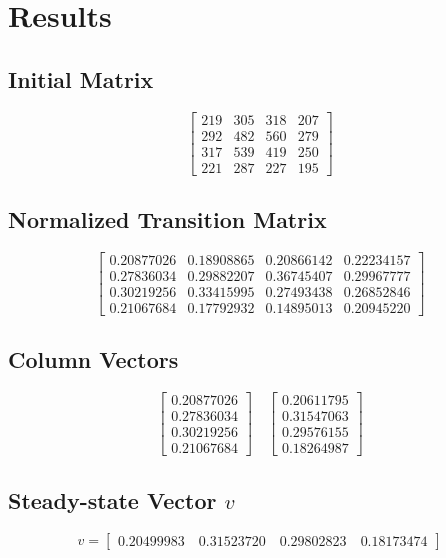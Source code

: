 \documentclass{article}
\begin{document}
\section*{Results}

\subsection*{Initial Matrix}
\[
\begin{bmatrix}
219 & 305 & 318 & 207 \\
292 & 482 & 560 & 279 \\
317 & 539 & 419 & 250 \\
221 & 287 & 227 & 195
\end{bmatrix}
\]

\subsection*{Normalized Transition Matrix}
\[
\begin{bmatrix}
0.20877026 & 0.18908865 & 0.20866142 & 0.22234157 \\
0.27836034 & 0.29882207 & 0.36745407 & 0.29967777 \\
0.30219256 & 0.33415995 & 0.27493438 & 0.26852846 \\
0.21067684 & 0.17792932 & 0.14895013 & 0.20945220
\end{bmatrix}
\]

\subsection*{Column Vectors}
\[
\begin{bmatrix}
0.20877026 \\
0.27836034 \\
0.30219256 \\
0.21067684
\end{bmatrix}
\quad
\begin{bmatrix}
0.20611795 \\
0.31547063 \\
0.29576155 \\
0.18264987
\end{bmatrix}
\]

\subsection*{Steady-state Vector \(v\)}
\[
v = \begin{bmatrix}
0.20499983 \quad 0.31523720 \quad 0.29802823 \quad 0.18173474
\end{bmatrix}
\]
\end{document}
